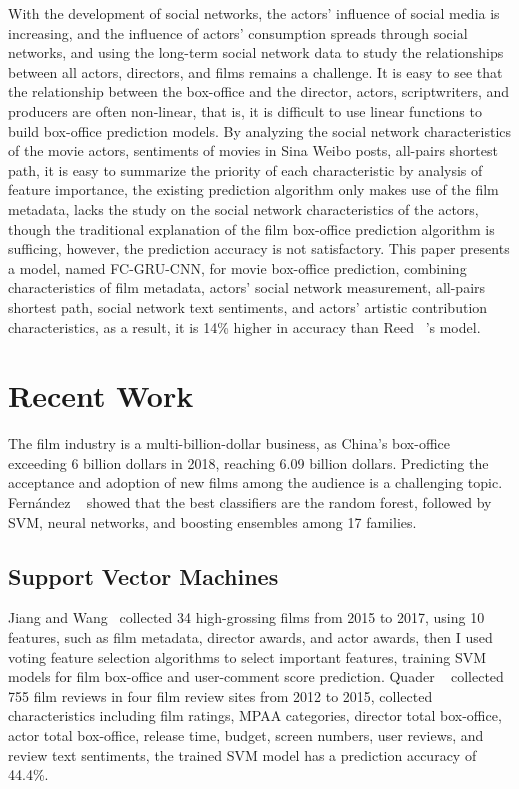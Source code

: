 \documentclass[review]{cvpr}
\begin{document}
  With the development of social networks, the actors' influence of social media is increasing,
  and the influence of actors' consumption spreads through social networks,
  and using the long-term social network data to study the relationships between all actors, directors, and films remains a challenge.
  It is easy to see that the relationship between the box-office and the director, actors, scriptwriters, and producers are often non-linear, that is,
  it is difficult to use linear functions to build box-office prediction models.
  By analyzing the social network characteristics of the movie actors, sentiments of movies in Sina Weibo posts, all-pairs shortest path,
  it is easy to summarize the priority of each characteristic by analysis of feature importance,
  the existing prediction algorithm only makes use of the film metadata, lacks the study on the social network characteristics of the actors,
  though the traditional explanation of the film box-office prediction algorithm is sufficing, however, the prediction accuracy is not satisfactory.
  This paper presents a model, named FC-GRU-CNN, for movie box-office prediction, combining characteristics of film metadata, actors' social network measurement,
  all-pairs shortest path, social network text sentiments, and actors' artistic contribution characteristics,
  as a result, it is 14\% higher in accuracy than Reed \etal~\cite{reed2016learning}'s model.


\section{Recent Work}

  The film industry is a multi-billion-dollar business, as China's box-office exceeding 6 billion dollars in 2018, reaching 6.09 billion dollars.
  Predicting the acceptance and adoption of new films among the audience is a challenging topic.
  Fern{\'a}ndez \etal ~\cite{fernandez2014we} showed that the best classifiers are the random forest,
  followed by SVM, neural networks, and boosting ensembles among 17 families.


\subsection{Support Vector Machines}

  Jiang and Wang~\cite{jiang2018predicting} collected 34 high-grossing films from 2015 to 2017, using 10 features, such as film metadata, director awards, and actor awards, then I used voting feature selection algorithms to select important features,
  training SVM models for film box-office and user-comment score prediction.
  Quader \etal~\cite{quader2017machine} collected 755 film reviews in four film review sites from 2012 to 2015, collected characteristics including film ratings, MPAA categories,
  director total box-office, actor total box-office, release time, budget, screen numbers, user reviews, and review text sentiments,
  the trained SVM model has a prediction accuracy of 44.4\%.
\end{document}
